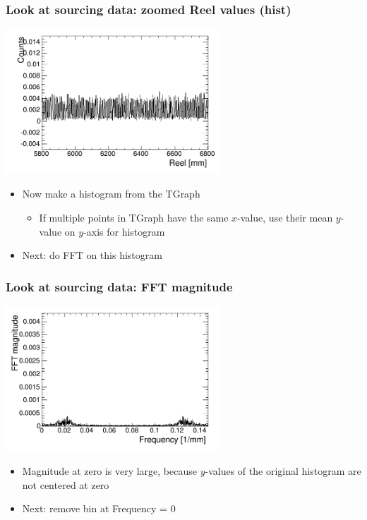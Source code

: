 \documentclass[bigger]{beamer}
\begin{document}
\begin{frame}
\frametitle{Look at sourcing data: zoomed Reel values (hist)}
\label{sec-3-1-5}
\label{sec-3-1-5-1}

\centering
\includegraphics[width=0.6\textwidth]{fig/original_histogram.png}
\begin{itemize}

\item Now make a histogram from the TGraph
\label{sec-3-1-5-2}%
\begin{itemize}

\item If multiple points in TGraph have the same $x$-value, use their mean $y$-value on $y$-axis for histogram
\label{sec-3-1-5-2-1}%
\end{itemize} %

\item Next: do FFT on this histogram
\label{sec-3-1-5-3}%
\end{itemize} %
\end{frame}
\begin{frame}
\frametitle{Look at sourcing data: FFT magnitude}
\label{sec-3-1-6}
\label{sec-3-1-6-1}

\centering
\includegraphics[width=0.6\textwidth]{fig/FFT_magnitude.png}
\begin{itemize}

\item Magnitude at zero is very large, because $y$-values of the original histogram are not centered at zero
\label{sec-3-1-6-2}%

\item Next: remove bin at Frequency = 0
\label{sec-3-1-6-3}%
\end{itemize} %
\end{frame}
\end{document}
